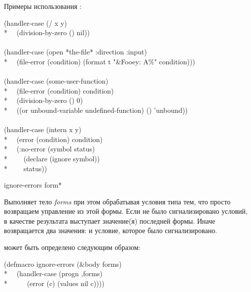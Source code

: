 \begin{defmac}
Примеры использования :
\begin{lisp}
(handler-case (/ x y) \\*
~~(division-by-zero () nil)) \\
 \\
(handler-case (open *the-file* :direction :input) \\*
~~(file-error (condition) (format t "{\Xtilde}\&Fooey: {\Xtilde}A{\Xtilde}\%" condition))) \\
 \\
(handler-case (some-user-function) \\*
~~(file-error (condition) condition) \\*
~~(division-by-zero () 0) \\*
~~((or unbound-variable undefined-function) () 'unbound)) \\
 \\
(handler-case (intern x y) \\*
~~(error (condition) condition) \\*
~~(:no-error (symbol status) \\*
~~~~(declare (ignore symbol)) \\*
~~~~status))
\end{lisp}
\end{defmac}

\begin{defmac}
ignore-errors {form}*

Выполняет тело \emph{forms} при этом обрабатывая условия типа  тем,
что просто возвращаем управление из этой формы. Если не было сигнализировано
условий, в качестве результата выступает значение(я) последней формы. Иначе
возвращается два значения:  и  условие, которое было
сигнализировано.

 может быть определено следующим образом:
\begin{lisp}
(defmacro ignore-errors (\&body forms) \\*
~~{\Xbq}(handler-case (progn ,{\Xatsign}forms) \\*
~~~~~(error (c) (values nil c))))
\end{lisp}
\end{defmac}

